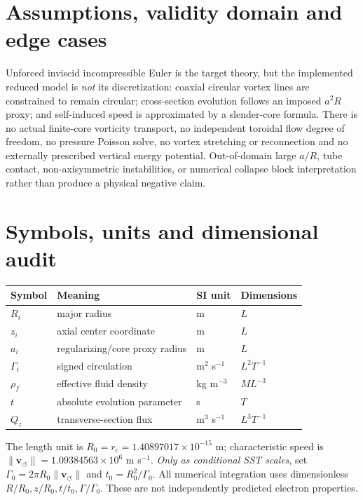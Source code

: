 \documentclass[10pt,a4paper]{article}
\newcommand{\vswirl}{\mathbf{v}_{\!\boldsymbol{\circlearrowleft}}}
\newcommand{\rhoF}{\rho_{\!f}}
\newcommand{\rc}{r_c}
\begin{document}
\section{Assumptions, validity domain and edge cases}
Unforced inviscid incompressible Euler is the target theory, but the implemented reduced model is \emph{not} its discretization: coaxial circular vortex lines are constrained to remain circular; cross-section evolution follows an imposed $a^2R$ proxy; and self-induced speed is approximated by a slender-core formula. There is no actual finite-core vorticity transport, no independent toroidal flow degree of freedom, no pressure Poisson solve, no vortex stretching or reconnection and no externally prescribed vertical energy potential. Out-of-domain large $a/R$, tube contact, non-axisymmetric instabilities, or numerical collapse block interpretation rather than produce a physical negative claim.

\section{Symbols, units and dimensional audit}
\begin{center}\begin{tabular}{llll}\toprule Symbol & Meaning & SI unit & Dimensions\\\midrule
$R_i$ & major radius & m & $L$\\
$z_i$ & axial center coordinate & m & $L$\\
$a_i$ & regularizing/core proxy radius & m & $L$\\
$\Gamma_i$ & signed circulation & m$^2$ s$^{-1}$ & $L^2T^{-1}$\\
$\rhoF$ & effective fluid density & kg m$^{-3}$ & $ML^{-3}$\\
$t$ & absolute evolution parameter & s & $T$\\
$Q_z$ & transverse-section flux & m$^3$ s$^{-1}$ & $L^3T^{-1}$\\\bottomrule\end{tabular}\end{center}
The length unit is $R_0=\rc=1.40897017\times10^{-15}$ m; characteristic speed is $\lVert\vswirl\rVert=1.09384563\times10^{6}$ m s$^{-1}$. \emph{Only as conditional SST scales}, set $\Gamma_0=2\pi R_0\lVert\vswirl\rVert$ and $t_0=R_0^2/\Gamma_0$. All numerical integration uses dimensionless $R/R_0,z/R_0,t/t_0,\Gamma/\Gamma_0$. These are not independently predicted electron properties.
\end{document}
